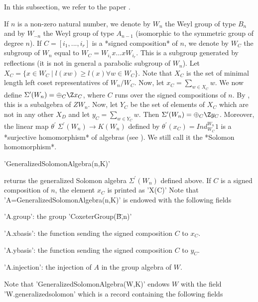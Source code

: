 
In this subsection, we refer to the paper \cite{BH05}.

If  $n$ is a non-zero natural number, we  denote by $W_n$ the Weyl group of
type  $B_n$ and by $W_{-n}$ the Weyl group of type $A_{n-1}$ (isomorphic to
the  symmetric  group  of  degree  $n$).  If $C=[i_1,...,i_r]$ is a *signed
composition* of $n$, we denote by $W_C$ the subgroup of $W_n$ equal to $W_C
= W_{i_1} x ... x W_{i_r}$. This is a subgroup generated by reflections (it
is  not in general a  parabolic subgroup of $W_n$).  Let $X_C = \{x \in W_C
\mid  l(xw) \ge l(x) \forall w \in  W_C\}$. Note that $X_C$ is the set of
minimal   length  left   coset  representatives   of  $W_n/W_C$.  Now,  let
$x_C=\sum_{w \in X_C} w$. We now define $\Sigma^\prime(W_n) = \oplus_C \Z
x_C$,  where $C$ runs over the  signed compositions of $n$. By \cite{BH05},
this  is a subalgebra of  $ZW_n$. Now, let $Y_C$  be the set of elements of
$X_C$  which are not in  any other $X_D$ and  let $y_C=\sum_{w \in Y_C} w$.
Then  $\Sigma^\prime(W_n) =  \oplus_C \Z  y_C$. Moreover,  the linear map
$\theta^\prime \:   \Sigma^\prime(W_n)    \to   K(W_n)$    defined   by
$\theta^\prime(x_C) = Ind_{W_C}^{W_n} 1$ is a *surjective homomorphism* of
algebras (see \cite{BH05}). We still call it the *Solomon homomorphism*.

'GeneralizedSolomonAlgebra(n,K)'

returns  the  generalized  Solomon  algebra  $\Sigma^\prime(W_n)$  defined
above.  If $C$ is a signed composition of $n$, the element $x_C$ is printed
as  'X(C)' Note  that 'A\:=GeneralizedSolomonAlgebra(n,K)'  is endowed with
the following fields\:

'A.group': the group 'CoxeterGroup(\"B\",n)'

'A.xbasis': the function sending the signed composition $C$ to $x_C$.

'A.ybasis': the function sending the signed composition $C$ to $y_C$.

'A.injection': the injection of $A$ in the group algebra of $W$.

Note  that  'GeneralizedSolomonAlgebra(W,K)'  endows  $W$  with  the  field
'W.generalizedsolomon' which is a record containing the following fields\:

